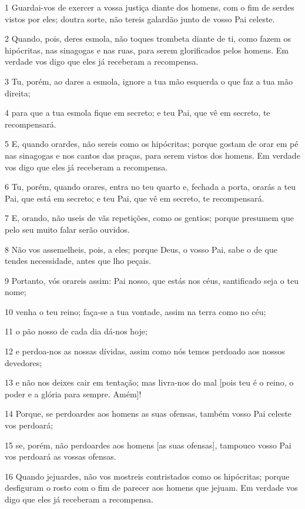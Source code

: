 \par 1 Guardai-vos de exercer a vossa justiça diante dos homens, com o fim de serdes vistos por eles; doutra sorte, não tereis galardão junto de vosso Pai celeste.
\par 2 Quando, pois, deres esmola, não toques trombeta diante de ti, como fazem os hipócritas, nas sinagogas e nas ruas, para serem glorificados pelos homens. Em verdade vos digo que eles já receberam a recompensa.
\par 3 Tu, porém, ao dares a esmola, ignore a tua mão esquerda o que faz a tua mão direita;
\par 4 para que a tua esmola fique em secreto; e teu Pai, que vê em secreto, te recompensará.
\par 5 E, quando orardes, não sereis como os hipócritas; porque gostam de orar em pé nas sinagogas e nos cantos das praças, para serem vistos dos homens. Em verdade vos digo que eles já receberam a recompensa.
\par 6 Tu, porém, quando orares, entra no teu quarto e, fechada a porta, orarás a teu Pai, que está em secreto; e teu Pai, que vê em secreto, te recompensará.
\par 7 E, orando, não useis de vãs repetições, como os gentios; porque presumem que pelo seu muito falar serão ouvidos.
\par 8 Não vos assemelheis, pois, a eles; porque Deus, o vosso Pai, sabe o de que tendes necessidade, antes que lho peçais.
\par 9 Portanto, vós orareis assim: Pai nosso, que estás nos céus, santificado seja o teu nome;
\par 10 venha o teu reino; faça-se a tua vontade, assim na terra como no céu;
\par 11 o pão nosso de cada dia dá-nos hoje;
\par 12 e perdoa-nos as nossas dívidas, assim como nós temos perdoado aos nossos devedores;
\par 13 e não nos deixes cair em tentação; mas livra-nos do mal [pois teu é o reino, o poder e a glória para sempre. Amém]!
\par 14 Porque, se perdoardes aos homens as suas ofensas, também vosso Pai celeste vos perdoará;
\par 15 se, porém, não perdoardes aos homens [as suas ofensas], tampouco vosso Pai vos perdoará as vossas ofensas.
\par 16 Quando jejuardes, não vos mostreis contristados como os hipócritas; porque desfiguram o rosto com o fim de parecer aos homens que jejuam. Em verdade vos digo que eles já receberam a recompensa.
